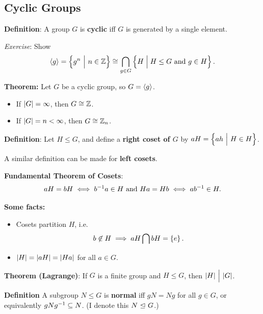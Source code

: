 \hypertarget{cyclic-groups}{%
\subsection{Cyclic Groups}\label{cyclic-groups}}

\textbf{Definition}: A group \(G\) is \textbf{cyclic} iff \(G\) is
generated by a single element.

\emph{Exercise}: Show
\begin{align*}
\left\langle{g}\right\rangle = \left\{{g^n {~\mathrel{\Big|}~} n\in{\mathbb{Z}}}\right\} \cong \bigcap_{g\in G} \left\{{H \mathrel{\Big|} H \leq G \text{ and } g\in H}\right\}
.\end{align*}

\textbf{Theorem:} Let \(G\) be a cyclic group, so
\(G = \left\langle{g}\right\rangle\).

\begin{itemize}
\item
  If \({\left\lvert {G} \right\rvert} = \infty\), then \(G \cong {\mathbb{Z}}\).
\item
  If \({\left\lvert {G} \right\rvert} = n < \infty\), then \(G \cong {\mathbb{Z}}_n\).
\end{itemize}

\textbf{Definition}: Let \(H \leq G\), and define a \textbf{right coset
of \(G\)} by \(aH = \left\{{ah {~\mathrel{\Big|}~} H \in H}\right\}\).

A similar definition can be made for \textbf{left cosets}.

\textbf{Fundamental Theorem of Cosets}:
\begin{align*}
aH = bH \iff b^{-1} a \in H \text{ and } Ha = Hb \iff ab^{-1} \in H
.\end{align*}

\textbf{Some facts:}

\begin{itemize}
\item
  Cosets partition \(H\), i.e.
  \begin{align*}
  b\not\in H \implies aH \bigcap bH = \left\{{e}\right\}
  .\end{align*}
\item
  \({\left\lvert {H} \right\rvert} = {\left\lvert {aH} \right\rvert} = {\left\lvert {Ha} \right\rvert}\) for all \(a\in G\).
\end{itemize}

\textbf{Theorem (Lagrange)}: If \(G\) is a finite group and
\(H \leq G\), then \({\left\lvert {H} \right\rvert} {~\Bigm| ~} {\left\lvert {G} \right\rvert}\).

\textbf{Definition} A subgroup \(N \leq G\) is \textbf{normal} iff
\(gN = Ng\) for all \(g\in G\), or equivalently \(gNg^{-1} \subseteq N\).
(I denote this \(N {~\trianglelefteq~} G\).)

